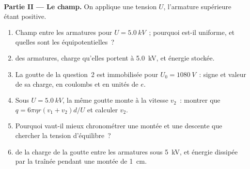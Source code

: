 \begin{problem}
\medskip
\noindent\textbf{Partie II --- Le champ.}
On applique une tension $U$, l'armature supérieure étant positive.
\begin{enumerate}[resume]
  \item Champ entre les armatures pour $U = \qty{5.0}{kV}$~; pourquoi est-il
        uniforme, et quelles sont les équipotentielles~?
  \item {} des armatures, charge qu'elles portent à \qty{5.0}{kV}, et
        énergie stockée.
  \item La goutte de la question~2 est immobilisée pour $U_0 = \qty{1080}{V}$~:
        signe et valeur de sa charge, en coulombs et en unités de $e$.
  \item Sous $U = \qty{5.0}{kV}$, la même goutte monte à la vitesse $v_2$~:
        montrer que $q = 6\pi\eta r(v_1 + v_2)d/U$ et calculer $v_2$.
  \item Pourquoi vaut-il mieux chronométrer une montée et une descente que
        chercher la tension d'équilibre~?
  \item {} de la charge de la goutte entre les armatures sous
        \qty{5}{kV}, et énergie dissipée par la traînée pendant une montée de
        \qty{1}{cm}.
\end{enumerate}


\end{problem}
